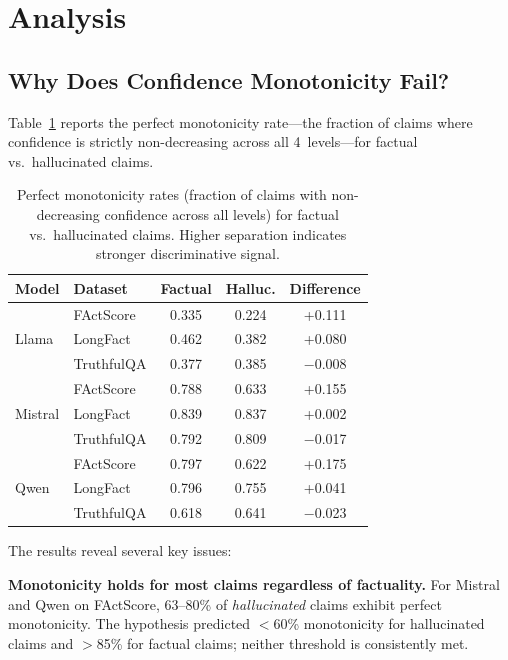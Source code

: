 \documentclass{article}
\begin{document}
\section{Analysis}
\label{sec:analysis}

\subsection{Why Does Confidence Monotonicity Fail?}
\label{sec:monotonicity_analysis}

Table~\ref{tab:monotonicity} reports the perfect monotonicity rate---the fraction of claims where confidence is strictly non-decreasing across all 4~levels---for factual vs.\ hallucinated claims.

\begin{table}[t]
\centering
\caption{Perfect monotonicity rates (fraction of claims with non-decreasing confidence across all levels) for factual vs.\ hallucinated claims. Higher separation indicates stronger discriminative signal.}
\label{tab:monotonicity}
\begin{tabular}{llccc}
\toprule
Model & Dataset & Factual & Halluc. & Difference \\
\midrule
\multirow{3}{*}{Llama}
  & FActScore  & 0.335 & 0.224 & +0.111 \\
  & LongFact   & 0.462 & 0.382 & +0.080 \\
  & TruthfulQA & 0.377 & 0.385 & $-$0.008 \\
\midrule
\multirow{3}{*}{Mistral}
  & FActScore  & 0.788 & 0.633 & +0.155 \\
  & LongFact   & 0.839 & 0.837 & +0.002 \\
  & TruthfulQA & 0.792 & 0.809 & $-$0.017 \\
\midrule
\multirow{3}{*}{Qwen}
  & FActScore  & 0.797 & 0.622 & +0.175 \\
  & LongFact   & 0.796 & 0.755 & +0.041 \\
  & TruthfulQA & 0.618 & 0.641 & $-$0.023 \\
\bottomrule
\end{tabular}
\end{table}

The results reveal several key issues:

\textbf{Monotonicity holds for most claims regardless of factuality.}
For Mistral and Qwen on FActScore, 63--80\% of \emph{hallucinated} claims exhibit perfect monotonicity.
The hypothesis predicted $<$60\% monotonicity for hallucinated claims and $>$85\% for factual claims; neither threshold is consistently met.
\end{document}
